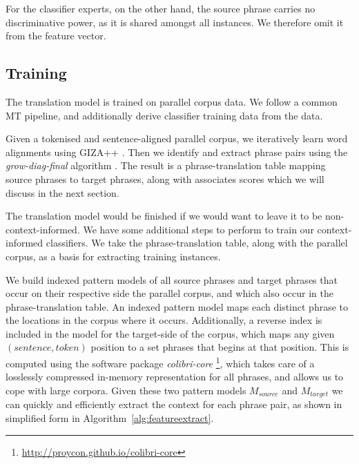 \documentclass[smallextended]{svjour3}       %
\theoremstyle{break}
\begin{document}
For the classifier experts, on the other hand, the source
phrase carries no discriminative power, as it is shared amongst all instances. We
therefore omit it from the feature vector.

\subsection{Training}

The translation model is trained on parallel corpus data. We follow a common
MT pipeline, and additionally derive classifier training data from the data.

Given a tokenised and sentence-aligned parallel corpus, we iteratively learn
word alignments using GIZA++ \citep{GIZA}. Then we identify and extract phrase
pairs using the {\em grow-diag-final}\/ algorithm \citep{OchNey2003}. The
result is a phrase-translation table mapping source phrases to target
phrases, along with associates scores which we will discuss in the next
section. %

The translation model would be finished if we would want to leave it to be
non-context-informed. We have some additional steps to perform to train our
context-informed classifiers. We take the phrase-translation table, along with
the parallel corpus, as a basis for extracting training instances.

We build indexed pattern models of all source phrases and target
phrases that occur on their respective side the parallel corpus, and
which also occur in the phrase-translation table. An indexed pattern
model maps each distinct phrase to the locations in the corpus where
it occurs.  Additionally, a reverse index is included in the model for
the target-side of the corpus, which maps any given
$(sentence, token)$ position to a set phrases that begins at that
position.  This is computed using the software package
\emph{colibri-core} \footnote{\url{http://proycon.github.io/colibri-core}},
which takes care of a losslessly compressed in-memory representation
for all phrases, and allows us to cope with large corpora. Given these
two pattern models $M_{source}$ and $M_{target}$ we can quickly and
efficiently extract the context for each phrase pair, as shown in
simplified form in Algorithm~\ref{alg:featureextract}.
\end{document}
